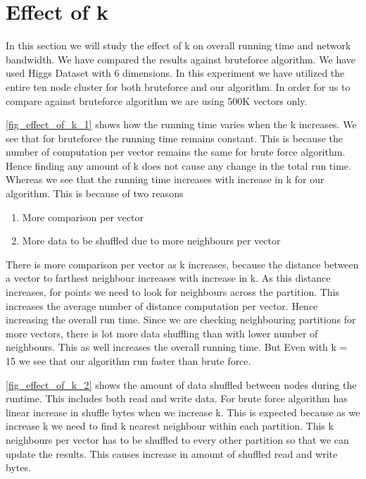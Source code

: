 \section{Effect of k}

In this section we will study the effect of k on overall running
time and network bandwidth. We have compared the results against bruteforce algorithm.
We have used Higgs Dataset with 6 dimensions. In this experiment we
have utilized the entire ten node cluster for both bruteforce and our
algorithm. In order for us to compare against bruteforce algorithm we are using
500K vectors only.

\cref{fig_effect_of_k_1} shows how
the running time varies when the k increases. We see that for
bruteforce the running time remains constant. This is because the
number of computation per vector remains the same for brute force
algorithm. Hence finding any amount of k does not
cause any change in the total run time. Whereas we see that the
running time increases with increase in k for our algorithm. This is
because of two reasons
\begin{enumerate}
\item More comparison per vector
\item More data to be shuffled due to more neighbours per vector
\end{enumerate}

There is more comparison per vector as k increases, because the distance between a vector to
farthest neighbour increases with increase in k. As this distance
increases,  for
points we need to look for neighbours across the partition. This
increases the average number of distance computation per vector. Hence
increasing the overall run time. Since we are checking neighbouring
partitions for more vectors, there is lot more data shuffling than
with lower number of neighbours. This as well increases the overall
running time. But Even with k = 15 we see that our
algorithm run faster than brute force.

\cref{fig_effect_of_k_2} shows the amount of data
shuffled between nodes during the runtime. This includes both read and
write data. For brute force algorithm has
linear increase in shuffle bytes when we increase k. This is expected
because as we increase k we need to find k nearest neighbour within
each partition. This k neighbours per vector has to be shuffled to every
other partition so that we can update the results. This causes
increase in amount of shuffled read and write bytes.

